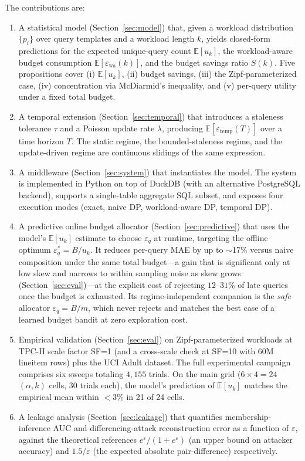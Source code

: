 \documentclass[sigconf,nonacm]{acmart}
\newcommand{\eps}{\varepsilon}
\newcommand{\E}{\mathbb{E}}
\begin{document}
The contributions are:

\begin{enumerate}
    \item A statistical model (Section~\ref{sec:model}) that, given a workload distribution $\{p_i\}$ over query templates and a workload length $k$, yields closed-form predictions for the expected unique-query count $\E[u_k]$, the workload-aware budget consumption $\E[\eps_{\mathrm{wa}}(k)]$, and the budget savings ratio $S(k)$. Five propositions cover (i) $\E[u_k]$, (ii) budget savings, (iii) the Zipf-parameterized case, (iv) concentration via McDiarmid's inequality, and (v) per-query utility under a fixed total budget.
    \item A temporal extension (Section~\ref{sec:temporal}) that introduces a staleness tolerance $\tau$ and a Poisson update rate $\lambda$, producing $\E[\eps_{\mathrm{temp}}(T)]$ over a time horizon $T$. The static regime, the bounded-staleness regime, and the update-driven regime are continuous slidings of the same expression.
    \item A middleware (Section~\ref{sec:system}) that instantiates the model. The system is implemented in Python on top of DuckDB (with an alternative PostgreSQL backend), supports a single-table aggregate SQL subset, and exposes four execution modes (exact, naive DP, workload-aware DP, temporal DP).
    \item A predictive online budget allocator (Section~\ref{sec:predictive}) that uses the model's $\E[u_k]$ estimate to choose $\eps_q$ at runtime, targeting the offline optimum $\eps_q^* = B / u_k$. It reduces per-query MAE by up to $\sim$17\% versus naive composition under the same total budget---a gain that is significant only at low skew and narrows to within sampling noise as skew grows (Section~\ref{sec:eval})---at the explicit cost of rejecting $12$--$31\%$ of late queries once the budget is exhausted. Its regime-independent companion is the \emph{safe} allocator $\eps_q=B/m$, which never rejects and matches the best case of a learned budget bandit at zero exploration cost.
    \item Empirical validation (Section~\ref{sec:eval}) on Zipf-parameterized workloads at TPC-H scale factor SF=1 (and a cross-scale check at SF=10 with 60M lineitem rows) plus the UCI Adult dataset. The full experimental campaign comprises six sweeps totaling $4{,}155$ trials. On the main grid ($6\times 4 = 24$ $(\alpha, k)$ cells, 30 trials each), the model's prediction of $\E[u_k]$ matches the empirical mean within $<3\%$ in 21 of 24 cells.
    \item A leakage analysis (Section~\ref{sec:leakage}) that quantifies membership-inference AUC and differencing-attack reconstruction error as a function of $\eps$, against the theoretical references $e^{\eps}/(1+e^{\eps})$ (an upper bound on attacker accuracy) and $1.5/\eps$ (the expected absolute pair-difference) respectively.
\end{enumerate}
\end{document}
